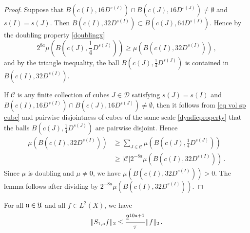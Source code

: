 \begin{proof}
    Suppose that $B(c(I), 16 D^{s(I)}) \cap B(c(J), 16 D^{s(J)}) \ne \emptyset$ and $s(I) = s(J)$. Then $B(c(I), 32 D^{s(I)}) \subset B(c(J), 64 D^{s(J)})$. Hence by the doubling property \eqref{doublingx}
    $$
        2^{8a}\mu(B(c(J), \frac{1}{4}D^{s(J)})) \ge \mu(B(c(I), 32 D^{s(I)}))\,,
    $$
    and by the triangle inequality, the ball $B(c(J), \frac{1}{4}D^{s(J)})$ is contained in $B(c(I), 32 D^{s(I)})$.

    If $\mathcal{C}$ is any finite collection of cubes $J \in \mathcal{D}$ satisfying $s(J) = s(I)$ and $B(c(I), 16 D^{s(I)}) \cap B(c(J), 16 D^{s(J)}) \ne\emptyset$, then it follows from \eqref{eq vol sp cube} and pairwise disjointness of cubes of the same scale \eqref{dyadicproperty} that the balls $B(c(J), \frac{1}{4} D^{s(J)})$ are pairwise disjoint. Hence
    \begin{align*}
        \mu(B(c(I), 32 D^{s(I)})) &\ge \sum_{J \in \mathcal{C}} \mu(B(c(J), \frac{1}{4}D^{s(J)}))\\
        &\ge |\mathcal{C}| 2^{-8a} \mu(B(c(I), 32 D^{s(I)}))\,.
    \end{align*}
    Since $\mu$ is doubling and $\mu \ne 0$, we have $\mu(B(c(I), 32D^{s(I)})) > 0$. The lemma follows after dividing by $2^{-8a}\mu(B(c(I), 32D^{s(I)}))$.
\end{proof}

\begin{lemma}
    \label{lem L2 Su estimate}
    For all $\mathfrak u \in \mathfrak U$ and all $f \in L^2(X)$, we have
    \begin{equation}
        \label{eq S bound}
        \|S_{1,\mathfrak u}f\|_2 \le \frac{2^{10a+1}}{\tau} \|f\|_2\,.
    \end{equation}
\end{lemma}

